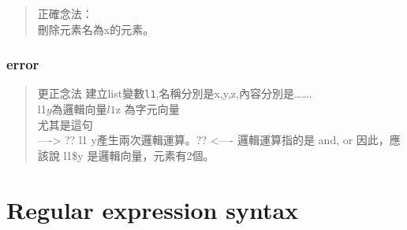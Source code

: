 \documentclass[]{book}
\newenvironment{Shaded}{\begin{snugshade}}{\end{snugshade}}
\newcommand{\DataTypeTok}[1]{\textcolor[rgb]{0.13,0.29,0.53}{#1}}
\newcommand{\DecValTok}[1]{\textcolor[rgb]{0.00,0.00,0.81}{#1}}
\newcommand{\KeywordTok}[1]{\textcolor[rgb]{0.13,0.29,0.53}{\textbf{#1}}}
\newcommand{\NormalTok}[1]{#1}
\newcommand{\OperatorTok}[1]{\textcolor[rgb]{0.81,0.36,0.00}{\textbf{#1}}}
\newcommand{\OtherTok}[1]{\textcolor[rgb]{0.56,0.35,0.01}{#1}}
\newcommand{\StringTok}[1]{\textcolor[rgb]{0.31,0.60,0.02}{#1}}
\theoremstyle{definition}
\theoremstyle{definition}
\theoremstyle{definition}
\theoremstyle{remark}
\begin{document}
\begin{Shaded}
\end{Shaded}

\begin{quote}
正確念法：\\
刪除元素名為x的元素。
\end{quote}

\hypertarget{error-2}{%
\subsection{error}\label{error-2}}

\begin{Shaded}
\end{Shaded}

\begin{quote}
更正念法
建立list變數\texttt{l1},名稱分別是x,y,z,內容分別是\ldots{}\ldots{}.\\
l1\(y 為邏輯向量 l1\)z 為字元向量\\
尤其是這句\\
----\textgreater{} ?? l1 y產生兩次邏輯運算。?? \textless{}----
邏輯運算指的是 and, or 因此，應該說 l1\$y 是邏輯向量，元素有2個。
\end{quote}

\hypertarget{regular-expression-syntax}{%
\chapter{Regular expression syntax}\label{regular-expression-syntax}}
\end{document}
